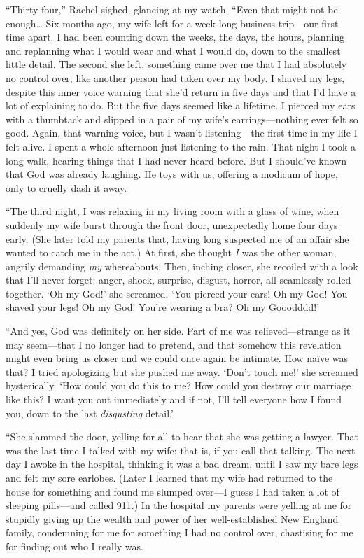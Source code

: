 ``Thirty-four,'' Rachel sighed, glancing at my watch. ``Even that might
not be enough\ldots{} Six months ago, my wife left for a week-long
business trip---our first time apart. I had been counting down the
weeks, the days, the hours, planning and replanning what I would wear
and what I would do, down to the smallest little detail. The second she
left, something came over me that I had absolutely no control over, like
another person had taken over my body. I shaved my legs, despite this
inner voice warning that she'd return in five days and that I'd have a
lot of explaining to do. But the five days seemed like a lifetime. I
pierced my ears with a thumbtack and slipped in a pair of my wife's
earrings---nothing ever felt so good. Again, that warning voice, but I
wasn't listening---the first time in my life I felt alive. I spent a
whole afternoon just listening to the rain. That night I took a long
walk, hearing things that I had never heard before. But I should've
known that God was already laughing. He toys with us, offering a modicum
of hope, only to cruelly dash it away.

``The third night, I was relaxing in my living room with a glass of wine,
when suddenly my wife burst through the front door, unexpectedly home
four days early. (She later told my parents that, having long suspected
me of an affair she wanted to catch me in the act.) At first, she
thought \emph{I} was the other woman, angrily demanding \emph{my}
whereabouts. Then, inching closer, she recoiled with a look that I'll
never forget: anger, shock, surprise, disgust, horror, all seamlessly
rolled together. `Oh my God!' she screamed. `You pierced your ears! Oh
my God! You shaved your legs! Oh my God! You're wearing a bra? Oh my
Gooodddd!'

``And yes, God was definitely on her side. Part of me was
relieved---strange as it may seem---that I no longer had to pretend, and
that somehow this revelation might even bring us closer and we could
once again be intimate. How naïve was that? I tried apologizing but she
pushed me away. `Don't touch me!' she screamed hysterically. `How could
you do this to me? How could you destroy our marriage like this? I want
you out immediately and if not, I'll tell everyone how I found you, down
to the last \emph{disgusting} detail.'

``She slammed the door, yelling for all to hear that she was getting a
lawyer. That was the last time I talked with my wife; that is, if you
call that talking. The next day I awoke in the hospital, thinking it was
a bad dream, until I saw my bare legs and felt my sore earlobes. (Later
I learned that my wife had returned to the house for something and found
me slumped over---I guess I had taken a lot of sleeping pills---and
called 911.) In the hospital my parents were yelling at me for stupidly
giving up the wealth and power of her well-established New England
family, condemning for me for something I had no control over,
chastising for me for finding out who I really was.

